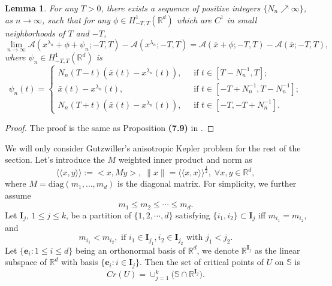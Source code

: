 \documentclass[11pt]{amsart}
\newcommand{\rr}{\mathbb R}
\newcommand{\A}{\mathcal A}
\newcommand{\bs}{\mathbb S}
\newcommand{\ee}{\mathbf e}
\newcommand{\I}{\mathbf I}
\newcommand{\lmd}{\lambda}
\newcommand{\ey}{\frac{1}{2}}
\def\me#1{\langle\!\langle #1 \rangle\!\rangle}
\theoremstyle{plain}
\newtheorem{lem}{Lemma}[section]
\theoremstyle{definition}
\theoremstyle{remark}
\begin{document}
\begin{lem}
\label{lem;blow-up-homo} For any $T>0$, there exist{}s a sequence of positive integers $\{N_n \nearrow \infty\}$, as $n \to \infty$, such that for any $\phi \in H^1_{-T, T}(\rr^d)$ which are $C^1$ in small neighborhoods of $T$ and $-T$, 
$$ \lim_{n \to \infty} \A(x^{\lmd_n} + \phi + \psi_n; -T, T) - \A(x^{\lmd_n};-T, T) = \A(\bar{x} + \phi; -T, T) - \A(\bar{x}; -T, T),$$
where $\psi_n \in H^1_{-T, T}(\rr^d)$ is 
\begin{equation}
\label{eq;psi-n} \psi_n(t) = \begin{cases}
N_n(T-t) (\bar{x}(t) - x^{\lmd_n}(t)), \; & \text{ if } t \in [T-N_n^{-1}, T]; \\
\bar{x}(t) - x^{\lmd_n}(t), \; & \text{ if } t \in [-T + N_n^{-1}, T - N_n^{-1}]; \\
N_n(T +t) (\bar{x}(t) - x^{\lmd_n}(t)), \; & \text{ if } t \in [-T, -T + N_n^{-1}].
\end{cases}
\end{equation}
\end{lem}

\begin{proof}
The proof is the same as Proposition \textbf{(7.9)} in \cite{FT04}.
\end{proof}

We will only consider Gutzwiller's anisotropic Kepler problem for the rest of the section. Let's introduce the $M$ weighted inner product and norm as 
$$ \me{x, y}:= <x, M y>, \; \|x\|= \me{x, x}^{\ey}, \; \forall x, y \in \rr^d,
$$
where $M = \text{diag}(m_1, \dots, m_d)$ is the diagonal matrix. For simplicity, we further assume 
$$ m_1 \le m_2 \le \cdots \le m_d.$$
Let $\I_j$, $1 \le j \le k$, be a partition of  $\{1, 2, \cdots, d\}$ satisfying $\{i_1, i_2 \} \subset \I_j$ iff $m_{i_1} = m_{i_2}$, and 
$$  m_{i_1} < m_{i_2}, \text{ if } i_1 \in \I_{j_1}, i_2 \in \I_{j_2} \text{ with } j_1 < j_2. $$
Let $\{\ee_i: 1 \le i \le d\}$ being an orthonormal basis of $\rr^d$, we denote $\rr^{\I_j}$ as the linear subspace of $\rr^d$ with basis $\{\ee_i: i \in \I_j\}$. Then the set of critical points of $U$ on $\bs$ is
\begin{equation}
\label{eq;Cr-U-aniso} Cr(U) = \cup_{j =1}^k \Big( \bs \cap \rr^{\I_j} \Big).
\end{equation}
\end{document}
